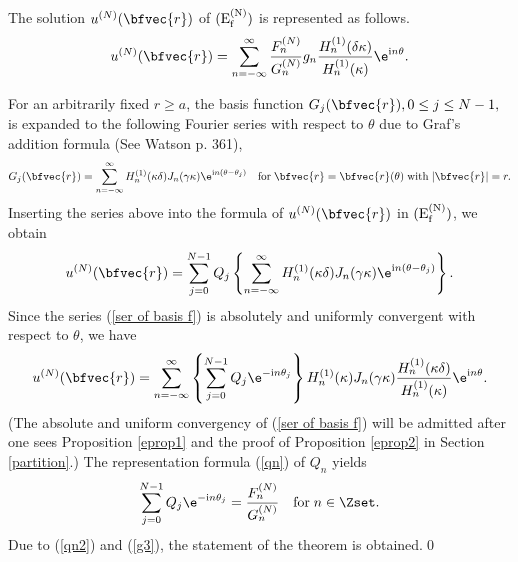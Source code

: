 \begin{thm}
\label{f-expansion}
The solution $u^{(N)}(\bfvec{r})$ of ${\rm (E^{(N)}_f)}$ is represented as follows.
\begin{equation}
u^{(N)}(\bfvec{r})=\sum^{\infty}_{n=-\infty}\frac{F^{(N)}_n}{G^{(N)}_n}g_n \frac{H^{(1)}_n(\delta\kappa)}{H^{(1)}_n(\kappa)}\e^{\mathrm{i}n\theta}.
\label{fsm-fexp0}
\end{equation}
\end{thm}
\begin{pf}
For an arbitrarily fixed $r\ge a$, the basis function $G_j(\bfvec{r}),0 \le j \le N-1,$ is expanded to the following Fourier series with respect to $\theta$ due to Graf's addition formula (See Watson \cite{Watson1966} p. 361),
\begin{equation}
G_j(\bfvec{r})=\sum^{\infty}_{n=-\infty}  H^{(1)}_n(\kappa \delta) J_n(\gamma \kappa)\e^{\mathrm{i} n (\theta-\theta_j)} \quad {\rm for}\; \bfvec{r}=\bfvec{r}(\theta) \;{\rm with}\;|\bfvec{r}|=r.
\label{ser of basis f}
\end{equation}
Inserting the series above into the formula of $u^{(N)}(\bfvec{r})$ in $({\rm E_f^{(N)}})$, we obtain
\begin{equation}
u^{(N)}(\bfvec{r})=\displaystyle \sum^{N-1}_{j=0} Q_j \left\{\sum^{\infty}_{n=-\infty}  H^{(1)}_n(\kappa \delta) J_n(\gamma \kappa)\e^{\mathrm{i} n (\theta-\theta_j)}\right\}.
\label{series}
\end{equation}
Since the series (\ref{ser of basis f}) is absolutely and uniformly convergent with respect to $\theta$, we have
\begin{eqnarray*}
u^{(N)}(\bfvec{r})=\displaystyle \sum^{\infty}_{n=-\infty} \left\{\sum^{N-1}_{j=0} Q_j \e^{-\mathrm{i} n \theta_j}\right\} H^{(1)}_n(\kappa) J_n(\gamma \kappa) \frac{H^{(1)}_n(\kappa \delta)}{H^{(1)}_n(\kappa)}\e^{\mathrm{i} n \theta}.%
\end{eqnarray*}
(The absolute and uniform convergency of (\ref{ser of basis f}) will be admitted after one sees Proposition \ref{eprop1} and the proof of Proposition \ref{eprop2} in Section \ref{partition}.)
The representation formula (\ref{qn}) of $Q_n$ yields
\begin{equation}
\sum^{N-1}_{j=0} Q_j \e^{-\mathrm{i} n \theta_j}=\frac{F^{(N)}_n}{G^{(N)}_n} \quad {\rm for}\; n \in \Zset.
\label{qn2}
\end{equation}
Due to (\ref{qn2}) and (\ref{g3}), the statement of the theorem is obtained.\qed
\end{pf}

